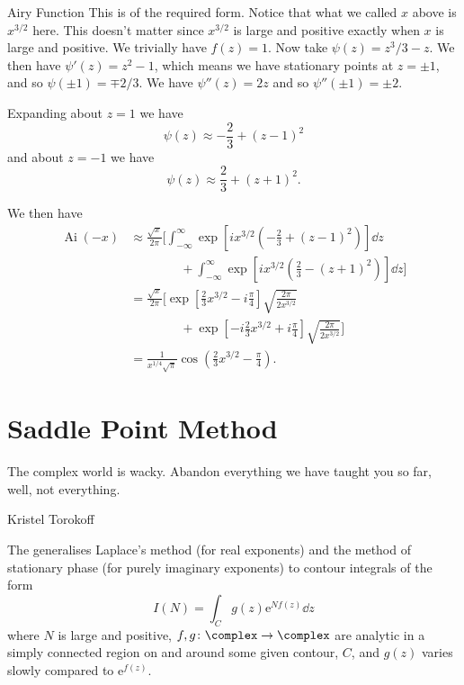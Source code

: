 \documentclass[fleqn]{NotesClass}
\newcommand*{\e}{\mathrm{e}}
\DeclareMathOperator{\Ai}{Ai}
\begin{document}
\begin{exm}{Airy Function}{}
        This is of the required form.
        Notice that what we called \(x\) above is \(x^{3/2}\) here.
        This doesn't matter since \(x^{3/2}\) is large and positive exactly when \(x\) is large and positive.
        We trivially have \(f(z) = 1\).
        Now take \(\psi(z) = z^3/3 - z\).
        We then have \(\psi'(z) = z^2 - 1\), which means we have stationary points at \(z = \pm 1\), and so \(\psi(\pm 1) = \mp 2/3\).
        We have \(\psi''(z) = 2z\) and so \(\psi''(\pm 1) = \pm 2\).
        
        Expanding about \(z = 1\) we have
        \begin{equation}
            \psi(z) \approx -\frac{2}{3} + (z - 1)^2
        \end{equation}
        and about \(z = -1\) we have
        \begin{equation}
            \psi(z) \approx \frac{2}{3} + (z + 1)^2.
        \end{equation}
        
        We then have
        \begin{align}
            \Ai(-x) &\approx \frac{\sqrt{x}}{2\pi} \bigg[ \int_{-\infty}^{\infty} \exp\left[ ix^{3/2}\left( -\frac{2}{3} + (z - 1)^2 \right) \right] \dd{z}\\
            &\qquad\qquad+ \int_{-\infty}^{\infty} \exp\left[ ix^{3/2}\left( \frac{2}{3} - (z + 1)^2 \right) \right] \dd{z} \bigg]\\
            &= \frac{\sqrt{x}}{2\pi} \bigg[ \exp\left[ \frac{2}{3}x^{3/2} - i\frac{\pi}{4} \right] \sqrt{\frac{2\pi}{2x^{3/2}}}\\
            &\qquad\qquad+ \exp\left[ -i\frac{2}{3}x^{3/2} + i\frac{\pi}{4} \right] \sqrt{\frac{2\pi}{2x^{3/2}}} \bigg]\\
            &= \frac{1}{x^{1/4}\sqrt{\pi}} \cos\left( \frac{2}{3}x^{3/2} - \frac{\pi}{4} \right).
        \end{align}
    \end{exm}
    
    \section{Saddle Point Method}
    \epigraph{The complex world is wacky. Abandon everything we have taught you so far, well, not everything.}{Kristel Torokoff}
    The  generalises Laplace's method (for real exponents) and the method of stationary phase (for purely imaginary exponents) to contour integrals of the form
    \begin{equation}
        I(N) = \int_C g(z)\e^{Nf(z)}\dd{z}
    \end{equation}
    where \(N\) is large and positive, \(f, g \colon \complex \to \complex\) are analytic in a simply connected region on and around some given contour, \(C\), and \(g(z)\) varies slowly compared to \(\e^{f(z)}\).
    
\end{document}

